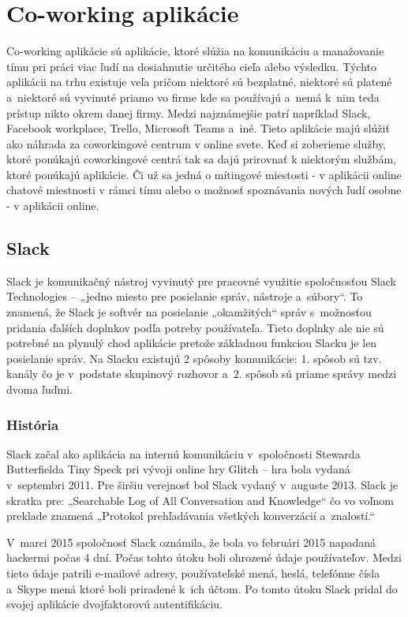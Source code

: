 \section{Co-working aplikácie}
\indent Co-working aplikácie sú aplikácie, ktoré slúžia na komunikáciu a manažovanie tímu pri práci viac ľudí na dosiahnutie určitého cieľa alebo výsledku. Týchto aplikácii na trhu existuje veľa pričom niektoré sú bezplatné, niektoré sú platené a niektoré sú vyvinuté priamo vo firme kde sa používajú a nemá k nim teda prístup nikto okrem danej firmy. Medzi najznámejšie patrí napríklad Slack, Facebook workplace, Trello, Microsoft Teams a iné. 
\indent Tieto aplikácie majú slúžiť ako náhrada za coworkingové centrum v online svete. Keď si zoberieme služby, ktoré ponúkajú coworkingové centrá tak sa dajú prirovnať k niektorým službám, ktoré ponúkajú aplikácie. Či už sa jedná o mítingové miestosti - v aplikácii online chatové miestnosti v rámci tímu alebo o možnosť spoznávania nových ľudí osobne - v aplikácii online. 

\subsection{Slack}
\indent Slack je komunikačný nástroj vyvinutý pre pracovné využitie spoločnosťou Slack Technologies – „jedno miesto pre posielanie správ, nástroje a súbory“. To znamená, že Slack je softvér na posielanie „okamžitých“ správ s možnosťou pridania ďalších doplnkov podľa potreby používateľa. Tieto doplnky ale nie sú potrebné na plynulý chod aplikácie pretože základnou funkciou Slacku je len posielanie správ. Na Slacku existujú 2 spôsoby komunikácie: 1. spôsob sú tzv. kanály čo je v podstate skupinový rozhovor a 2. spôsob sú priame správy medzi dvoma ľuďmi. 
\subsubsection{História}
\indent Slack začal ako aplikácia na internú komunikáciu v spoločnosti Stewarda Butterfielda Tiny Speck pri vývoji online hry Glitch – hra bola vydaná v septembri 2011. Pre širšiu verejnosť bol Slack vydaný v auguste 2013. Slack je skratka pre: „Searchable Log of All Conversation and Knowledge“ čo vo voľnom preklade znamená „Protokol prehľadávania všetkých konverzácií a znalostí.“

\indent V marci 2015 spoločnosť Slack oznámila, že bola vo februári 2015 napadaná hackermi počas 4 dní. Počas tohto útoku boli ohrozené údaje používateľov. Medzi tieto údaje patrili e-mailové adresy, používateľské mená, heslá, telefónne čísla a Skype mená ktoré boli priradené k ich účtom. Po tomto útoku Slack pridal do svojej aplikácie dvojfaktorovú autentifikáciu. 
